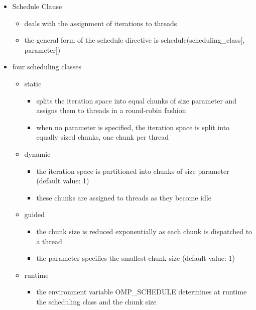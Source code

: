 \begin{itemize}
\tightlist
\item
  Schedule Clause

  \begin{itemize}
  \tightlist
  \item
    deals with the assignment of iterations to threads
  \item
    the general form of the schedule directive is
    schedule(scheduling\_class{[}, parameter{]})
  \end{itemize}
\item
  four scheduling classes

  \begin{itemize}
  \tightlist
  \item
    static

    \begin{itemize}
    \tightlist
    \item
      splits the iteration space into equal chunks of size parameter and
      assigns them to threads in a round-robin fashion
    \item
      when no parameter is specified, the iteration space is split into
      equally sized chunks, one chunk per thread
    \end{itemize}
  \item
    dynamic

    \begin{itemize}
    \tightlist
    \item
      the iteration space is partitioned into chunks of size parameter
      (default value: 1)
    \item
      these chunks are assigned to threads as they become idle
    \end{itemize}
    \clearpage
  \item
    guided

    \begin{itemize}
    \tightlist
    \item
      the chunk size is reduced exponentially as each chunk is
      dispatched to a thread
    \item
      the parameter specifies the smallest chunk size (default value: 1)
    \end{itemize}
  \item
    runtime

    \begin{itemize}
    \tightlist
    \item
      the environment variable OMP\_SCHEDULE determines at runtime the
      scheduling class and the chunk size
    \end{itemize}
  \end{itemize}
\end{itemize}

